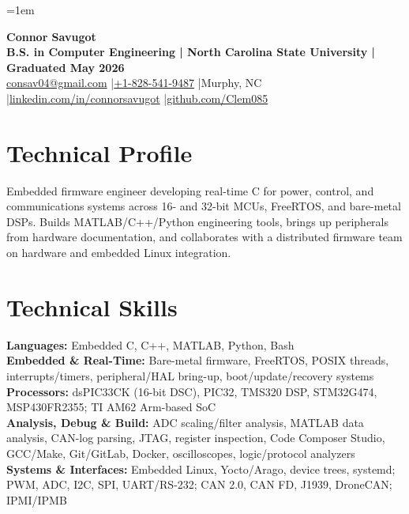 \documentclass[10pt,letterpaper]{article}
\begin{document}
\fontsize{9.65}{10.50}\selectfont
\setlength{\RaggedRightRightskip}{0pt plus 5em}
\RaggedRight
\emergencystretch=1em

\begin{center}
  {\fontsize{21.5}{22.2}\selectfont\bfseries Connor Savugot}\\[1.5pt]
  {\bfseries B.S. in Computer Engineering | North Carolina State University | Graduated May 2026}\\[1.5pt]
  {\fontsize{9.6}{10.2}\selectfont
    \href{mailto:consav04@gmail.com}{consav04@gmail.com}
    \enspace|\enspace \href{tel:+18285419487}{+1-828-541-9487}
    \enspace|\enspace Murphy, NC
    \enspace|\enspace \href{https://linkedin.com/in/connorsavugot}{linkedin.com/in/connorsavugot}
    \enspace|\enspace \href{https://github.com/Clem085}{github.com/Clem085}}
\end{center}
\vspace{-0.18cm}

\section{Technical Profile}
Embedded firmware engineer developing real-time C for power, control, and communications systems across 16- and 32-bit MCUs, FreeRTOS, and bare-metal DSPs. Builds MATLAB/C++/Python engineering tools, brings up peripherals from hardware documentation, and collaborates with a distributed firmware team on hardware and embedded Linux integration.

\section{Technical Skills}
\textbf{Languages:} Embedded C, C++, MATLAB, Python, Bash\\
\textbf{Embedded \& Real-Time:} Bare-metal firmware, FreeRTOS, POSIX threads, interrupts/timers, peripheral/HAL bring-up, boot/update/recovery systems\\
\textbf{Processors:} dsPIC33CK (16-bit DSC), PIC32, TMS320 DSP, STM32G474, MSP430FR2355; TI AM62 Arm-based SoC\\
\textbf{Analysis, Debug \& Build:} ADC scaling/filter analysis, MATLAB data analysis, CAN-log parsing, JTAG, register inspection, Code Composer Studio, GCC/Make, Git/GitLab, Docker, oscilloscopes, logic/protocol analyzers\\
\textbf{Systems \& Interfaces:} Embedded Linux, Yocto/Arago, device trees, systemd; PWM, ADC, I2C, SPI, UART/RS-232; CAN 2.0, CAN FD, J1939, DroneCAN; IPMI/IPMB
\end{document}

